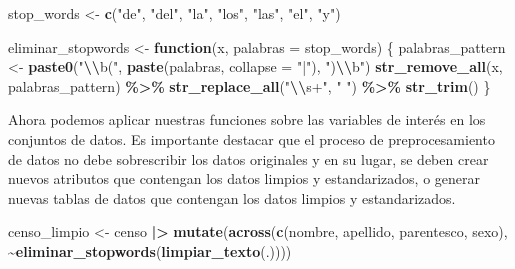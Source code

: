 \documentclass[
  12pt,
]{book}
\newenvironment{Shaded}{\begin{snugshade}}{\end{snugshade}}
\newcommand{\AttributeTok}[1]{\textcolor[rgb]{0.13,0.29,0.53}{#1}}
\newcommand{\ControlFlowTok}[1]{\textcolor[rgb]{0.13,0.29,0.53}{\textbf{#1}}}
\newcommand{\FunctionTok}[1]{\textcolor[rgb]{0.13,0.29,0.53}{\textbf{#1}}}
\newcommand{\NormalTok}[1]{#1}
\newcommand{\OtherTok}[1]{\textcolor[rgb]{0.56,0.35,0.01}{#1}}
\newcommand{\SpecialCharTok}[1]{\textcolor[rgb]{0.81,0.36,0.00}{\textbf{#1}}}
\newcommand{\StringTok}[1]{\textcolor[rgb]{0.31,0.60,0.02}{#1}}
\begin{document}
\begin{Shaded}
\begin{Highlighting}[]
\NormalTok{stop\_words }\OtherTok{\textless{}{-}} \FunctionTok{c}\NormalTok{(}\StringTok{"de"}\NormalTok{, }\StringTok{"del"}\NormalTok{, }\StringTok{"la"}\NormalTok{, }\StringTok{"los"}\NormalTok{, }\StringTok{"las"}\NormalTok{, }\StringTok{"el"}\NormalTok{, }\StringTok{"y"}\NormalTok{)}

\NormalTok{eliminar\_stopwords }\OtherTok{\textless{}{-}} \ControlFlowTok{function}\NormalTok{(x, }\AttributeTok{palabras =}\NormalTok{ stop\_words) \{}
\NormalTok{  palabras\_pattern }\OtherTok{\textless{}{-}} \FunctionTok{paste0}\NormalTok{(}\StringTok{"}\SpecialCharTok{\textbackslash{}\textbackslash{}}\StringTok{b("}\NormalTok{, }\FunctionTok{paste}\NormalTok{(palabras, }\AttributeTok{collapse =} \StringTok{"|"}\NormalTok{), }\StringTok{")}\SpecialCharTok{\textbackslash{}\textbackslash{}}\StringTok{b"}\NormalTok{)}
  \FunctionTok{str\_remove\_all}\NormalTok{(x, palabras\_pattern) }\SpecialCharTok{\%\textgreater{}\%}
    \FunctionTok{str\_replace\_all}\NormalTok{(}\StringTok{"}\SpecialCharTok{\textbackslash{}\textbackslash{}}\StringTok{s+"}\NormalTok{, }\StringTok{" "}\NormalTok{) }\SpecialCharTok{\%\textgreater{}\%}
    \FunctionTok{str\_trim}\NormalTok{()}
\NormalTok{\}}
\end{Highlighting}
\end{Shaded}

Ahora podemos aplicar nuestras funciones sobre las variables de interés en los conjuntos de datos. Es importante destacar que el proceso de preprocesamiento de datos no debe sobrescribir los datos originales y en su lugar, se deben crear nuevos atributos que contengan los datos limpios y estandarizados, o generar nuevas tablas de datos que contengan los datos limpios y estandarizados.

\begin{Shaded}
\begin{Highlighting}[]
\NormalTok{censo\_limpio }\OtherTok{\textless{}{-}}\NormalTok{ censo }\SpecialCharTok{|\textgreater{}} 
                \FunctionTok{mutate}\NormalTok{(}\FunctionTok{across}\NormalTok{(}\FunctionTok{c}\NormalTok{(nombre, apellido, parentesco, sexo),}
                              \SpecialCharTok{\textasciitilde{}}\FunctionTok{eliminar\_stopwords}\NormalTok{(}\FunctionTok{limpiar\_texto}\NormalTok{(.))))}
\end{Highlighting}
\end{Shaded}
\end{document}
